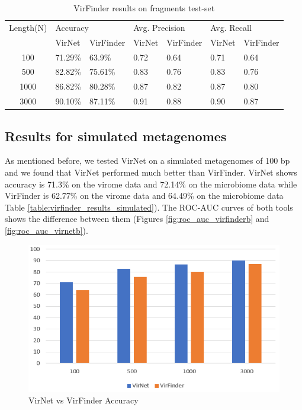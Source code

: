 \documentclass[10pt,journal,compsoc]{IEEEtran}
\begin{document}
\begin{table}[!htbp]
	\centering
	\begin{tabular}{||c l l l l l l||} 
		Length(N) &	\multicolumn{2}{l}{Accuracy} & \multicolumn{2}{l}{Avg. Precision} & \multicolumn{2}{l}{Avg. Recall}\\ [0.5ex] 
		& VirNet & VirFinder & VirNet & VirFinder & VirNet & VirFinder \\
		\hline\hline
		100 & 71.29\% &	63.9\%	& 0.72 & 0.64 & 0.71 & 0.64 \\
		500 & 82.82\% &	75.61\% & 0.83 &	0.76 & 0.83 & 0.76\\
		1000 & 86.82\% &	80.28\% &  0.87 & 0.82 & 0.87 & 0.80 \\
		3000 & 90.10\% &	87.11\% & 0.91 & 0.88 & 0.90 & 0.87 \\[1ex]
	\end{tabular}
	\caption{VirFinder results on fragments test-set}
	\label{table:virfinder_results}
\end{table}

\subsection{Results for simulated metagenomes}

As mentioned before, we tested VirNet on a simulated metagenomes of 100 bp and we found that VirNet performed much better than VirFinder. VirNet shows accuracy is 71.3\% on the virome data and 72.14\% on the microbiome data while VirFinder is 62.77\% on the virome data and 64.49\% on the microbiome data Table \ref{table:virfinder_results_simulated}). The ROC-AUC curves of both tools shows the difference between them (Figures \ref{fig:roc_auc_virfinderb} and \ref{fig:roc_auc_virnetb}).

\begin{figure}
	\centering
	\includegraphics[width=\columnwidth]{imgs/accuracy_graph.PNG}
	\caption{VirNet vs VirFinder Accuracy}
	\label{fig:accuracy_graph}
\end{figure}
\end{document}
